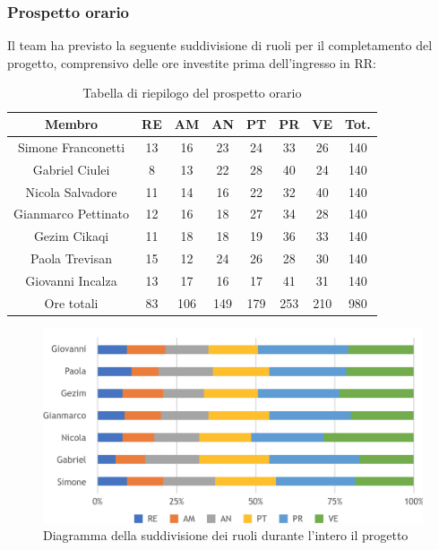 \subsubsection{Prospetto orario}
Il team ha previsto la seguente suddivisione di ruoli per il completamento del progetto, comprensivo delle ore investite prima dell'ingresso in RR:
\begin{table}[h]
\caption{Tabella di riepilogo del prospetto orario}  
\begin{center}
\begin{tabular}{ |c|c|c|c|c|c|c|c|  }
 \hline
 Membro 		& RE 		& AM 		& AN 	& PT 	& PR 	& VE 	& Tot.\\
 \hline\hline
 Simone	Franconetti		& 13 		& 16			& 23 		& 24 		& 33 		& 26 		& 140\\
 Gabriel Ciulei		& 8 			& 13 		& 22 		& 28		& 40 		& 24 		& 140\\
 Nicola	Salvadore		& 11 		& 14 		& 16 		& 22 		& 32 		& 40 		& 140\\
 Gianmarco Pettinato		& 12 		& 16 		& 18 		& 27	 	& 34 		& 28 		& 140\\
 Gezim Cikaqi		& 11 		& 18 		& 18 		& 19 		& 36 		& 33	 	& 140\\
 Paola Trevisan		& 15 		& 12 		& 24 		& 26 		& 28 		& 30 		& 140\\
 Giovanni	Incalza	& 13 		& 17	 		& 16 		& 17 		& 41	 	& 31  		& 140\\
 \hline\hline
 Ore totali		& 83 	& 106		& 149 	& 179 	& 253 	& 210 	& 980\\
  \hline
\end{tabular}
\end{center}
\end{table}
\begin{figure}[h!]
	\includegraphics[width=\textwidth]{res/img/hip3}
	\caption{Diagramma della suddivisione dei ruoli durante l'intero il progetto}
\end{figure}

